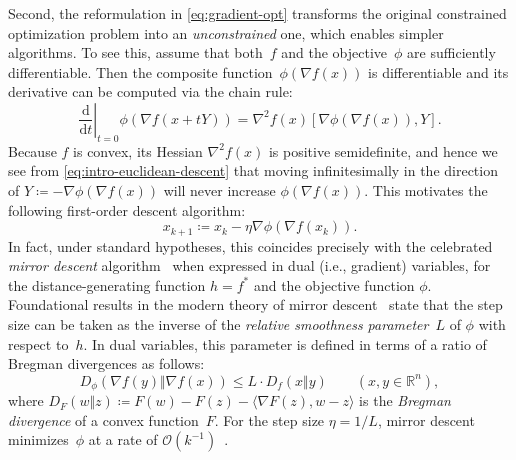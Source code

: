 \documentclass[11pt,letterpaper]{article}
\numberwithin{equation}{section}
\newcommand{\RR}{\mathbb{R}}
\newcommand{\diff}{\mathrm{d}}
\begin{document}
Second, the reformulation in \eqref{eq:gradient-opt} transforms the original constrained optimization problem into an \emph{unconstrained} one, which enables simpler algorithms.
To see this, assume that both~$f$ and the objective~$\phi$ are sufficiently differentiable.
Then the composite function~$\phi(\nabla f(x))$ is differentiable and its derivative can be computed via the chain rule:
\begin{equation}\label{eq:intro-euclidean-descent}
    \left.\frac{\diff}{\diff t}\right|_{t = 0}\phi(\nabla f(x + tY)) = \nabla^2f(x)\left[ \nabla \phi\left(\nabla f(x)\right), Y\right ].
\end{equation}
Because $f$ is convex, its Hessian $\nabla^2 f(x)$ is positive semidefinite, and hence we see from \cref{eq:intro-euclidean-descent} that moving infinitesimally in the direction of $Y \coloneqq -\nabla \phi(\nabla f(x))$ will never increase $\phi(\nabla f(x))$.
This motivates the following first-order descent algorithm:
\begin{equation}\label{eq:intro-mirror-descent}
    x_{k+1} \coloneqq x_k - \eta\nabla \phi(\nabla f(x_k)).
\end{equation}
In fact, under standard hypotheses, this coincides precisely with the celebrated \emph{mirror descent} algorithm~\cite{NY1983} when expressed in dual (i.e., gradient) variables, for the distance-generating function $h = f^\ast$ and the objective function $\phi$.
Foundational results in the modern theory of mirror descent~\cite{BBT2017,LFN2018} state that the step size can be taken as the inverse of the \emph{relative smoothness parameter}~$L$ of $\phi$ with respect to~$h$.
In dual variables, this parameter is defined in terms of a ratio of Bregman divergences as follows:
\begin{equation}\label{eq:intro-relative-smoothness}
    D_\phi(\nabla f(y)\Vert\nabla f(x)) \le L\cdot D_f(x\Vert y) \qquad (x, y \in \RR^n),
\end{equation}
where $D_F(w\Vert z)\coloneqq F(w) - F(z) - \langle\nabla F(z), w - z\rangle$ is the \emph{Bregman divergence} of a convex function~$F$.
For the step size $\eta = 1/L$, mirror descent minimizes~$\phi$ at a rate of $\mathcal{O}(k^{-1})$~\cite{BBT2017,LFN2018}.

\medskip
\end{document}
